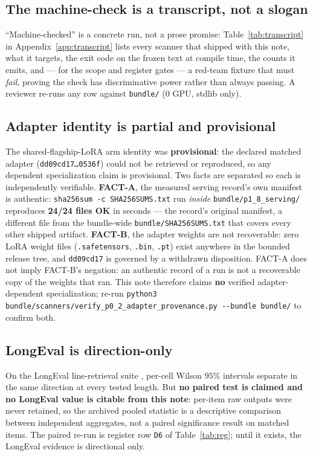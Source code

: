 \documentclass{article}
\newcommand{\zb}{\discretionary{}{}{}}
\newcommand{\code}[1]{\texttt{#1}}
\begin{document}
\subsection{The machine-check is a transcript, not a slogan}\label{sec:transcript}
``Machine-checked'' is a concrete run, not a prose promise: Table~\ref{tab:transcript} in
Appendix~\ref{app:transcript} lists every scanner that shipped with this note, what it targets,
the exit code on the frozen text at compile time, the counts it emits, and --- for the scope and
register gates --- a red-team fixture that must {\em fail}, proving the check has discriminative
power rather than always passing. A reviewer re-runs any row against \code{bundle/} (0 GPU,
stdlib only).

\subsection{Adapter identity is partial and provisional}\label{sec:p02}
The shared-flagship-LoRA arm identity was \textbf{provisional}: the declared matched adapter
(\code{dd09cd17\ldots0536f}) could not be retrieved or reproduced, so any dependent
specialization claim is provisional. Two facts are separated so each is independently
verifiable. \textbf{FACT-A}, the measured serving record's own manifest is authentic:
\code{sha256sum -c SHA256SUMS.txt} run \emph{inside} \code{bundle/p1\_8\_serving/} reproduces
\textbf{24/24 files OK} in seconds --- the record's original manifest, a different file from the
bundle-wide \code{bundle/SHA256SUMS.txt} that covers every other shipped artifact.
\textbf{FACT-B}, the adapter weights are not recoverable: zero LoRA weight files
(\code{.safetensors}, \code{.bin}, \code{.pt}) exist anywhere in the bounded release tree, and
\code{dd09cd17} is governed by a withdrawn disposition. FACT-A does not imply FACT-B's negation:
an authentic record of a run is not a recoverable copy of the weights that ran. This note
therefore claims \textbf{no} verified adapter-dependent specialization; re-run
\code{python3 bundle/scanners/\zb verify\_p0\_2\_\zb adapter\_provenance.py -{}-bundle bundle/}
to confirm both.

\subsection{LongEval is direction-only}\label{sec:p04}
On the LongEval line-retrieval suite \citep{li2023longeval}, per-cell Wilson $95\%$ intervals
\citep{wilson1927interval} separate in the same direction at every tested length. But
\textbf{no paired test is claimed and no LongEval value is citable from this note}: per-item raw
outputs were never retained, so the archived pooled statistic is a descriptive comparison between
independent aggregates, not a paired significance result on matched items. The paired re-run is
register row \texttt{D6} of Table~\ref{tab:reg}; until it exists, the LongEval evidence is
directional only.
\end{document}
